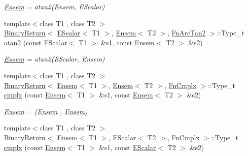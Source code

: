 \begin{DoxyCompactItemize}
\begin{DoxyCompactList}\small\item\em \mbox{\hyperlink{classENSEM_1_1Ensem}{Ensem}} = atan2(\+Ensem, E\+Scalar) \end{DoxyCompactList}\item 
{\footnotesize template$<$class T1 , class T2 $>$ }\\\mbox{\hyperlink{structENSEM_1_1BinaryReturn}{Binary\+Return}}$<$ \mbox{\hyperlink{classENSEM_1_1EScalar}{E\+Scalar}}$<$ T1 $>$, \mbox{\hyperlink{classENSEM_1_1Ensem}{Ensem}}$<$ T2 $>$, \mbox{\hyperlink{structENSEM_1_1FnArcTan2}{Fn\+Arc\+Tan2}} $>$\+::Type\+\_\+t \mbox{\hyperlink{group__eensem_ga04b957edb43f4b1eee36cecfac095807}{atan2}} (const \mbox{\hyperlink{classENSEM_1_1EScalar}{E\+Scalar}}$<$ T1 $>$ \&s1, const \mbox{\hyperlink{classENSEM_1_1Ensem}{Ensem}}$<$ T2 $>$ \&s2)
\begin{DoxyCompactList}\small\item\em \mbox{\hyperlink{classENSEM_1_1Ensem}{Ensem}} = atan2(\+E\+Scalar, Ensem) \end{DoxyCompactList}\item 
{\footnotesize template$<$class T1 , class T2 $>$ }\\\mbox{\hyperlink{structENSEM_1_1BinaryReturn}{Binary\+Return}}$<$ \mbox{\hyperlink{classENSEM_1_1Ensem}{Ensem}}$<$ T1 $>$, \mbox{\hyperlink{classENSEM_1_1Ensem}{Ensem}}$<$ T2 $>$, \mbox{\hyperlink{structENSEM_1_1FnCmplx}{Fn\+Cmplx}} $>$\+::Type\+\_\+t \mbox{\hyperlink{group__eensem_gaed2aa58870f554b9ad30212f8d25ca46}{cmplx}} (const \mbox{\hyperlink{classENSEM_1_1Ensem}{Ensem}}$<$ T1 $>$ \&s1, const \mbox{\hyperlink{classENSEM_1_1Ensem}{Ensem}}$<$ T2 $>$ \&s2)
\begin{DoxyCompactList}\small\item\em \mbox{\hyperlink{classENSEM_1_1Ensem}{Ensem}} = (\mbox{\hyperlink{classENSEM_1_1Ensem}{Ensem}} , \mbox{\hyperlink{classENSEM_1_1Ensem}{Ensem}}) \end{DoxyCompactList}\item 
{\footnotesize template$<$class T1 , class T2 $>$ }\\\mbox{\hyperlink{structENSEM_1_1BinaryReturn}{Binary\+Return}}$<$ \mbox{\hyperlink{classENSEM_1_1Ensem}{Ensem}}$<$ T1 $>$, \mbox{\hyperlink{classENSEM_1_1EScalar}{E\+Scalar}}$<$ T2 $>$, \mbox{\hyperlink{structENSEM_1_1FnCmplx}{Fn\+Cmplx}} $>$\+::Type\+\_\+t \mbox{\hyperlink{group__eensem_gadd471503e7ac8d60fb8a955e1999f6fa}{cmplx}} (const \mbox{\hyperlink{classENSEM_1_1Ensem}{Ensem}}$<$ T1 $>$ \&s1, const \mbox{\hyperlink{classENSEM_1_1EScalar}{E\+Scalar}}$<$ T2 $>$ \&s2)

\end{DoxyCompactItemize}
